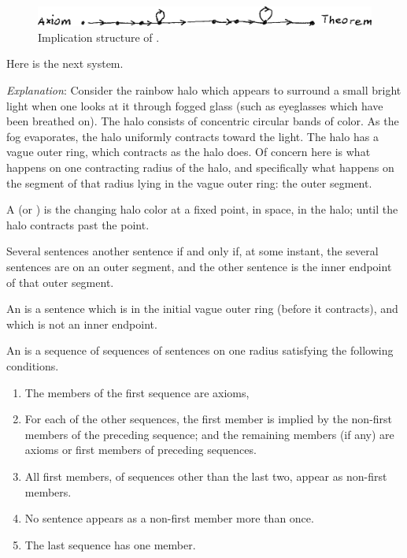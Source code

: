 \begin{figure}
	{\centering \includegraphics[width=4.5in]{img/orderstructure} \par}
	\caption{Implication structure of .}
	\label{orderstruc}
\end{figure}

Here is the next system. 


\begin{sysrules}
\emph{Explanation}: Consider the rainbow halo which appears to surround a small 
bright light when one looks at it through fogged glass (such as 
eyeglasses which have been breathed on). The halo consists of 
concentric circular bands of color. As the fog evaporates, the halo 
uniformly contracts toward the light. The halo has a vague outer 
ring, which contracts as the halo does. Of concern here is what 
happens on one contracting radius of the halo, and specifically 
what happens on the segment of that radius lying in the vague 
outer ring: the outer segment. 

A  (or ) is the changing halo color at a fixed point, in 
space, in the halo; until the halo contracts past the point. 

Several sentences  another sentence if and only if, at some instant, 
the several sentences are on an outer segment, and the other 
sentence is the inner endpoint of that outer segment. 

An  is a sentence which is in the initial vague outer ring (before it 
contracts), and which is not an inner endpoint. 

An  is a sequence of sequences of sentences on one radius 
satisfying the following conditions. 
	\begin{enumerate}
		\item The members of the first sequence are axioms, 
		\item For each of the other sequences, the first member is implied by the non-first members of the preceding sequence; and the remaining members (if any) are axioms or first members of preceding sequences. 
		\item All first members, of sequences other than the last two, appear as non-first members. 
		\item No sentence appears as a non-first member more than once. 
		\item The last sequence has one member. 
	\end{enumerate}
\end{sysrules}


